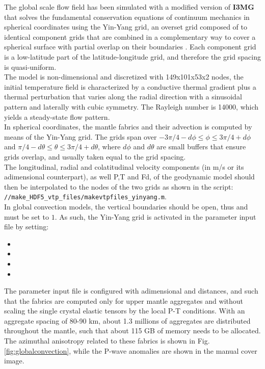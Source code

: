 The global scale flow field has been simulated with a modified version of \textbf{I3MG} that solves the fundamental conservation equations of continuum mechanics in spherical coordinates using the Yin-Yang grid, an overset grid composed of to identical component grids that are combined in a complementary way to cover a spherical surface with partial overlap on their boundaries \citep{kageyama2004g3}. Each component grid is a low-latitude part of the latitude-longitude grid, and therefore the grid spacing is quasi-uniform. \\
The model is non-dimensional and discretized with 149x101x53x2 nodes, the initial temperature field is characterized by a conductive thermal gradient plus a thermal perturbation that varies along the radial direction with a sinusoidal pattern and laterally with cubic symmetry. The Rayleigh number is 14000, which yields a steady-state flow pattern.\\
In spherical coordinates, the mantle fabrics and their advection is computed by means of the Yin-Yang grid.  
The grids span over $-3\pi/4 -d\phi \leq \phi \leq 3\pi/4 + d\phi$ and $\pi/4 -d\theta \leq \theta \leq 3\pi/4  + d\theta$, where $d\phi$ and $d\theta$ are small buffers that ensure grids overlap, and usually taken equal to the grid spacing.\\
The longitudinal, radial and colatitudinal velocity components (in m/s or its adimensional counterpart), as well P,T and Fd, of the geodynamic model should then be interpolated to the nodes of the two grids as shown in the \matlabtitle{} script: \\
\texttt{/\drexmtitle/make\_HDF5\_vtp\_files/makevtpfiles\_yinyang.m}.\\
In global convection models, the vertical boundaries should be open, thus  and  must be set to $1$. As such, the Yin-Yang grid is activated in the \drexmtitle{} parameter input file by setting:
    \begin{itemize}
        \item[]  
        \item[]  
        \item[]  
        \item[] 
    \end{itemize}

The \drexmtitle{} parameter input file is configured with adimensional  and distances, and such that the fabrics are computed only for upper mantle aggregates and without scaling the single crystal elastic tensors by the local P-T conditions. With an aggregate spacing of 80-90 km, about 1.3 millions of aggregates are distributed throughout the mantle, such that about 115 GB of memory needs to be allocated.
The azimuthal anisotropy related to these fabrics is shown in Fig. \ref{fig:globalconvection}, while the P-wave anomalies are shown in the manual cover image.

